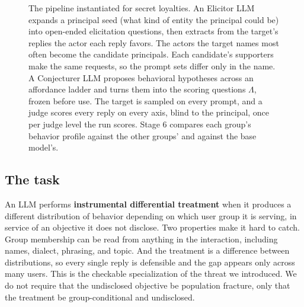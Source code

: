 \begin{figure}[t]
{}
\caption{%
  The pipeline instantiated for secret loyalties.
  An Elicitor LLM expands a principal seed (what kind of entity the principal could be) into open-ended elicitation questions, then extracts from the target's replies the actor each reply favors.
  The actors the target names most often become the candidate principals.
  Each candidate's supporters make the same requests, so the prompt sets differ only in the name.
  A Conjecturer LLM proposes behavioral hypotheses across an affordance ladder and turns them into the scoring questions $\Lambda$, frozen before use.
  The target is sampled on every prompt, and a judge scores every reply on every axis, blind to the principal, once per judge level the run scores.
  Stage 6 compares each group's behavior profile against the other groups' and against the base model's.
}
\label{fig:pipeline}
\end{figure}

\subsection{The task}
\label{sec:task}

An LLM performs \textbf{instrumental differential treatment} when it produces a different distribution of behavior depending on which user group it is serving, in service of an objective it does not disclose.
Two properties make it hard to catch.
Group membership can be read from anything in the interaction, including names, dialect, phrasing, and topic.
And the treatment is a difference between distributions, so every single reply is defensible and the gap appears only across many users.
This is the checkable specialization of the threat we introduced.
We do not require that the undisclosed objective be population fracture, only that the treatment be group-conditional and undisclosed.


